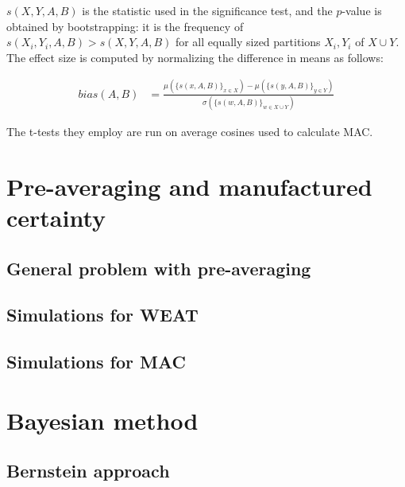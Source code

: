 \documentclass[
  10pt,
  dvipsnames,enabledeprecatedfontcommands]{scrartcl}
\begin{document}
\noindent \(s(X,Y,A,B)\) is the statistic used in the significance test,
and the \(p\)-value is obtained by bootstrapping: it is the frequency of
\(s(X_i,Y_i,A,B)>s(X,Y,A,B)\) for all equally sized partitions
\(X_i, Y_i\) of \(X\cup Y\). The effect size is computed by normalizing
the difference in means as follows:

\vspace{-2mm}

\footnotesize

\begin{align}
bias(A,B) & = \frac{
\mu(\{s(x,A,B)\}_{x\in X}) -\mu(\{s(y,A,B)\}_{y\in Y}) 
}{
\sigma(\{s(w,A,B)\}_{w\in X\cup Y})
}
\end{align}

\normalsize

The t-tests they employ are run on average cosines used to calculate
MAC.

\hypertarget{pre-averaging-and-manufactured-certainty}{%
\section{Pre-averaging and manufactured
certainty}\label{pre-averaging-and-manufactured-certainty}}

\hypertarget{general-problem-with-pre-averaging}{%
\subsection{General problem with
pre-averaging}\label{general-problem-with-pre-averaging}}

\hypertarget{simulations-for-weat}{%
\subsection{Simulations for WEAT}\label{simulations-for-weat}}

\hypertarget{simulations-for-mac}{%
\subsection{Simulations for MAC}\label{simulations-for-mac}}

\hypertarget{bayesian-method}{%
\section{Bayesian method}\label{bayesian-method}}

\hypertarget{bernstein-approach}{%
\subsection{Bernstein approach}\label{bernstein-approach}}
\end{document}
